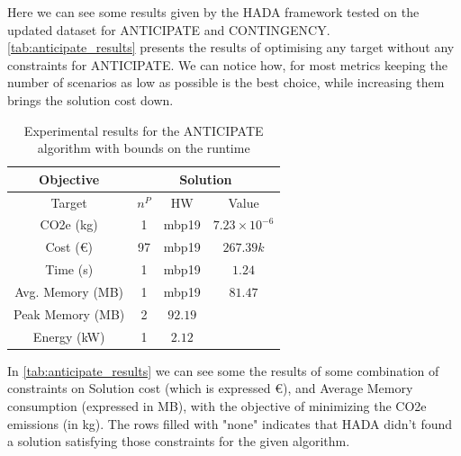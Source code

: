 \documentclass[a4paper,singleside,12pt]{report} %
\begin{document}
Here we can see some results given by the HADA framework tested on the updated dataset for ANTICIPATE and CONTINGENCY. \ref{tab:anticipate_results}
presents the results of optimising any target without any constraints for ANTICIPATE. We can notice how, for most metrics keeping the number of scenarios
as low as possible is the best choice, while increasing them brings the solution cost down.

\begin{table}[h!]
    \centering
    \begin{tabular}{c|ccc}
        \hline
        \multicolumn{1}{c|}{Objective} & \multicolumn{3}{c}{Solution} \\
        \hline
        Target & $n^P$ & HW & Value \\
        \hline
        CO2e (kg) & 1 & mbp19 & $7.23 \times 10^{-6}$ \\
        Cost (€) & 97 & mbp19 & $267.39k$ \\
        Time (s)& 1 & mbp19 & $1.24$ \\
        Avg. Memory (MB) & 1 & mbp19 & $81.47$ \\
        Peak Memory (MB) & 2 & $92.19$ \\
        Energy (kW) & 1 & $2.12$ \\
        \hline
    \end{tabular}
    \caption{Experimental results for the ANTICIPATE algorithm with bounds on the runtime}
    \label{tab:anticipate_min_targets}
\end{table}

In \ref{tab:anticipate_results} we can see some the results of some combination of constraints on Solution cost (which is
expressed €), and Average Memory consumption (expressed in MB), with the objective of minimizing the CO2e 
emissions (in kg). The rows filled with "none" indicates that HADA didn't found a solution satisfying those constraints for the
given algorithm.
\end{document}
